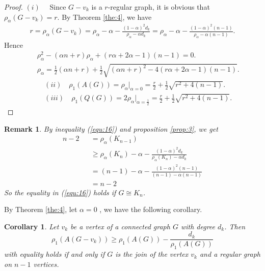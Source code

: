\documentclass[amsthm]{elsart}
\newtheorem{corollary}{Corollary}[section]
\newtheorem{remark}{Remark}[section]
\begin{document}
\begin{proof}
$(i) \quad$ Since $G - v_k$ is a $r$-regular graph, it is obvious that $\rho _\alpha (G - v_k) = r$.
By Theorem \ref{the:4}, we have
\begin{eqnarray*}
r = \rho _\alpha (G - v_k)
  = \rho _\alpha - \alpha - \frac{(1 - \alpha)^2 d_k}{\rho _\alpha - \alpha d_k}
  = \rho _\alpha - \alpha - \frac{(1 - \alpha)^2 (n - 1)}{\rho _\alpha - \alpha (n - 1)}.
\end{eqnarray*}
Hence
\begin{eqnarray*}
&& \rho _\alpha ^2 - (\alpha n + r) \rho _\alpha + (r \alpha + 2 \alpha - 1) ( n - 1) = 0.
\\ && \rho _\alpha = \frac{1}{2}(\alpha n + r) + \frac{1}{2} \sqrt{(\alpha n + r)^2 - 4 (r \alpha + 2 \alpha - 1) ( n - 1) }.
\end{eqnarray*}
\begin{eqnarray*}
&&(ii) \quad \rho _1(A(G)) = \rho _\alpha | _{\alpha = 0} = \frac{r}{2} + \frac{1}{2} \sqrt{r ^2 + 4 ( n - 1) } .
\\ &&(iii) \quad \rho _1(Q(G)) = 2 \rho _\alpha | _{\alpha = \frac{1}{2}} = \frac{r}{2} + \frac{1}{2} \sqrt{r ^2 + 4 ( n - 1) } .
\end{eqnarray*}
\end{proof}

\begin{remark}
By inequality (\ref{equ:16}) and proposition \ref{prop:3}, we get
\begin{eqnarray*}
n - 2 &&= \rho_\alpha(K_{n - 1})
\\ &&\geqslant \rho _\alpha(K_n) - \alpha - \frac{(1 - \alpha)^2 d_k}{\rho _\alpha(K_n) - \alpha d_k}
\\ &&= (n-1) - \alpha - \frac{(1 - \alpha)^2 (n-1)}{(n-1) - \alpha (n-1)}
\\ &&= n - 2
\end{eqnarray*}
So the equality in (\ref{equ:16})  holds if $G \cong K_n$.
\end{remark}

By Theorem \ref{the:4}, let $\alpha = 0$ , we have the following corollary.
\begin{corollary} \label{coro:4}
Let $v_k$ be a vertex of a connected graph $G$ with degree $d_k$.  Then
\begin{equation} \label{equ:coro4}
\rho _1 (A(G - v_k))
  \geqslant \rho _1(A(G)) - \frac{d_k}{\rho _1(A(G))}
\end{equation}
with equality holds if and only if $G$ is the join of the vertex $v_k$ and a regular graph on $n-1$ vertices.
\end{corollary}
\end{document}
